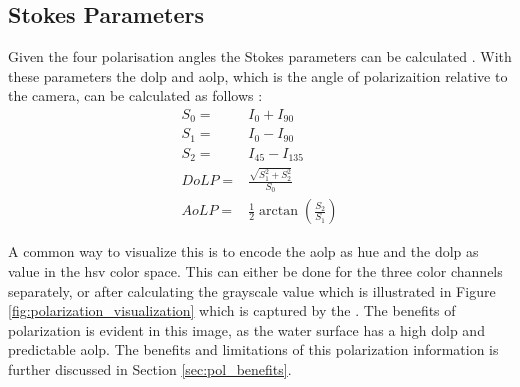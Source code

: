 \subsection{Stokes Parameters}
Given the four polarisation angles the Stokes parameters can be calculated \cite{piascoSurveyVisualBasedLocalization2018}.
With these parameters the \gls{dolp} and \gls{aolp}, which is the angle of polarizaition relative to the camera, can be calculated as follows \cite{piascoSurveyVisualBasedLocalization2018}:
\begin{align}
    S_0 =  & I_0 + I_{90}                                                      \\
    S_1 =  & I_0 - I_{90}                                                      \\
    S_2 =  & I_{45} - I_{135}                                                  \\
    DoLP = & \frac{\sqrt{S_1^2 + S_2^2}}{S_0}  \label{eq:dolp}                 \\
    AoLP = & \frac{1}{2} \arctan{\left(\frac{S_2}{S_1}\right)} \label{eq:aolp}
\end{align}

A common way to visualize this is to encode the \gls{aolp} as hue and the \gls{dolp} as value in the \gls{hsv} color space.
This can either be done for the three color channels separately, or after calculating the grayscale value which is illustrated in Figure \ref{fig:polarization_visualization} which is captured by the \sr.
The benefits of polarization is evident in this image, as the water surface has a high \gls{dolp} and predictable \gls{aolp}.
The benefits and limitations of this polarization information is further discussed in Section \ref{sec:pol_benefits}.

